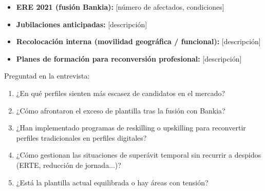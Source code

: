 \begin{itemize}
  \item \textbf{ERE 2021 (fusión Bankia):} [número de afectados, condiciones]
  \item \textbf{Jubilaciones anticipadas:} [descripción]
  \item \textbf{Recolocación interna (movilidad geográfica / funcional):} [descripción]
  \item \textbf{Planes de formación para reconversión profesional:} [descripción]
\end{itemize}

\begin{notaequipo}
  Preguntad en la entrevista:
  \begin{enumerate}
    \item ¿En qué perfiles sienten más escasez de candidatos en el mercado?
    \item ¿Cómo afrontaron el exceso de plantilla tras la fusión con Bankia?
    \item ¿Han implementado programas de reskilling o upskilling para
          reconvertir perfiles tradicionales en perfiles digitales?
    \item ¿Cómo gestionan las situaciones de superávit temporal
          sin recurrir a despidos (ERTE, reducción de jornada...)?
    \item ¿Está la plantilla actual equilibrada o hay áreas con tensión?
  \end{enumerate}
\end{notaequipo}
